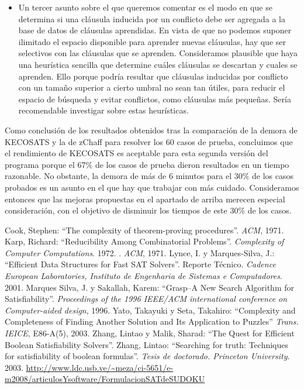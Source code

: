 \documentclass[12pt,lettersize,oneside]{article}
\begin{document}
\begin{itemize}
\item Un tercer asunto sobre el que queremos comentar es el modo en que se
  determina si una cláusula inducida por un conflicto debe ser agregada a la
  base de datos de cláusulas aprendidas. En vista de que no podemos suponer
  ilimitado el espacio disponible para aprender nuevas cláusulas, hay que ser
  selectivos con las cláusulas que se aprenden. Consideramos plausible que haya
  una heurística sencilla que determine cuáles cláusulas se descartan y cuales
  se aprenden. Ello porque podría resultar que cláusulas inducidas por conflicto
  con un tamaño superior a cierto umbral no sean tan útiles, para reducir el
  espacio de búsqueda y evitar conflictos, como cláusulas más pequeñas. Sería
  recomendable investigar sobre estas heurísticas.


\end{itemize}

Como conclusión de los resultados obtenidos tras la comparación de la demora de
KECOSATS y la de zChaff para resolver los 60 casos de prueba, concluimos que el
rendimiento de KECOSATS es aceptable para esta segunda versión del programa
porque el 67\% de los casos de prueba dieron resultados en un tiempo
razonable. No obstante, la demora de más de 6 minutos para el 30\% de los casos
probados es un asunto en el que hay que trabajar con más cuidado. Consideramos
entonces que las mejoras propuestas en el apartado de arriba merecen especial
consideración, con el objetivo de disminuir los tiempos de este 30\% de los
casos.

\begin{thebibliography}{99}
Cook, Stephen: ``The complexity of theorem-proving
  procedures''. \emph{ACM}, 1971.
Karp, Richard: ``Reducibility Among Combinatorial
  Problems''. \emph{Complexity of Computer Computations}. 1972.
  . \emph{ACM}, 1971.
Lynce, I. y Marques-Silva, J.: ``Efficient Data Structures for
  Fast SAT Solvers''. Reporte Técnico. \emph{Cadence European Laboratories,
    Instituto de Engenharia de Sistemas e Computadores}. 2001.
Marques Silva, J. y Sakallah, Karem: ``Grasp--A New Search
  Algorithm for Satisfiability''. \emph{Proceedings of the 1996 IEEE/ACM
    international conference on Computer-aided design}, 1996.
Yato, Takayuki y Seta, Takahiro: ``Complexity and Completeness
  of Finding Another Solution and Its Application to Puzzles''  \emph{Trans. IEICE}, E86-A(5), 2003.
Zhang, Lintao y Malik, Sharad: ``The Quest for Efficient Boolean
  Satisfiability Solvers''.
Zhang, Lintao: ``Searching for truth: Techniques for
  satisfiability of boolean formulas''. \emph{Tesis de doctorado. Princeton
    University}. 2003.
\url{http://www.ldc.usb.ve/~meza/ci-5651/e-m2008/articulosYsoftware/FormulacionSATdeSUDOKU}
\end{thebibliography}
\end{document}
